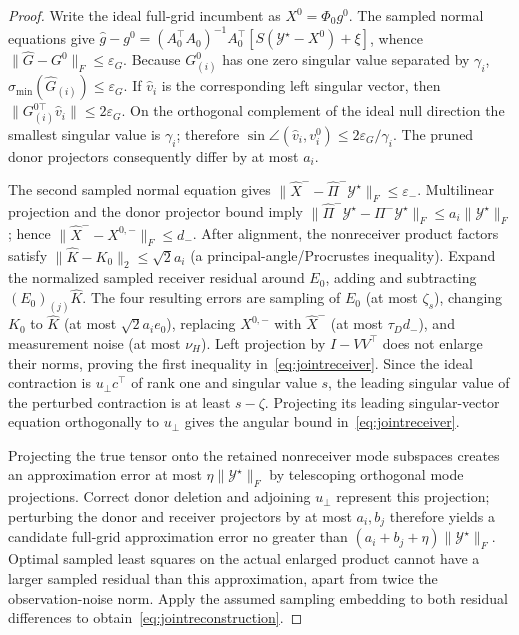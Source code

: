 \documentclass[review,10pt]{elsarticle}
\newcommand{\cY}{\mathcal Y}
\begin{document}
\begin{proof}
Write the ideal full-grid incumbent as $X^0=\Phi_0g^0$. The sampled normal equations give $\widehat g-g^0=(A_0^\top A_0)^{-1}A_0^\top[S(\cY^\star-X^0)+\xi]$, whence $\|\widehat G-G^0\|_F\le\varepsilon_G$. Because $G^0_{(i)}$ has one zero singular value separated by $\gamma_i$, $\sigma_{\min}(\widehat G_{(i)})\le\varepsilon_G$. If $\widehat v_i$ is the corresponding left singular vector, then $\|G^{0\top}_{(i)}\widehat v_i\|\le2\varepsilon_G$. On the orthogonal complement of the ideal null direction the smallest singular value is $\gamma_i$; therefore $\sin\angle(\widehat v_i,v_i^0)\le 2\varepsilon_G/\gamma_i$. The pruned donor projectors consequently differ by at most $a_i$.

The second sampled normal equation gives $\|\widehat X^--\widehat\Pi^-\cY^\star\|_F\le\varepsilon_-$. Multilinear projection and the donor projector bound imply $\|\widehat\Pi^-\cY^\star-\Pi^-\cY^\star\|_F\le a_i\|\cY^\star\|_F$; hence $\|\widehat X^--X^{0,-}\|_F\le d_-$. After alignment, the nonreceiver product factors satisfy $\|\widehat K-K_0\|_2\le\sqrt2 a_i$ (a principal-angle/Procrustes inequality). Expand the normalized sampled receiver residual around $E_0$, adding and subtracting $(E_0)_{(j)}\widehat K$. The four resulting errors are sampling of $E_0$ (at most $\zeta_s$), changing $K_0$ to $\widehat K$ (at most $\sqrt2 a_i e_0$), replacing $X^{0,-}$ with $\widehat X^-$ (at most $\tau_Dd_-$), and measurement noise (at most $\nu_H$). Left projection by $I-VV^\top$ does not enlarge their norms, proving the first inequality in~\eqref{eq:jointreceiver}. Since the ideal contraction is $u_\perp c^\top$ of rank one and singular value $s$, the leading singular value of the perturbed contraction is at least $s-\zeta$. Projecting its leading singular-vector equation orthogonally to $u_\perp$ gives the angular bound in~\eqref{eq:jointreceiver}.

Projecting the true tensor onto the retained nonreceiver mode subspaces creates an approximation error at most $\eta\|\cY^\star\|_F$ by telescoping orthogonal mode projections. Correct donor deletion and adjoining $u_\perp$ represent this projection; perturbing the donor and receiver projectors by at most $a_i,b_j$ therefore yields a candidate full-grid approximation error no greater than $(a_i+b_j+\eta)\|\cY^\star\|_F$. Optimal sampled least squares on the actual enlarged product cannot have a larger sampled residual than this approximation, apart from twice the observation-noise norm. Apply the assumed sampling embedding to both residual differences to obtain~\eqref{eq:jointreconstruction}.\end{proof}
\end{document}
